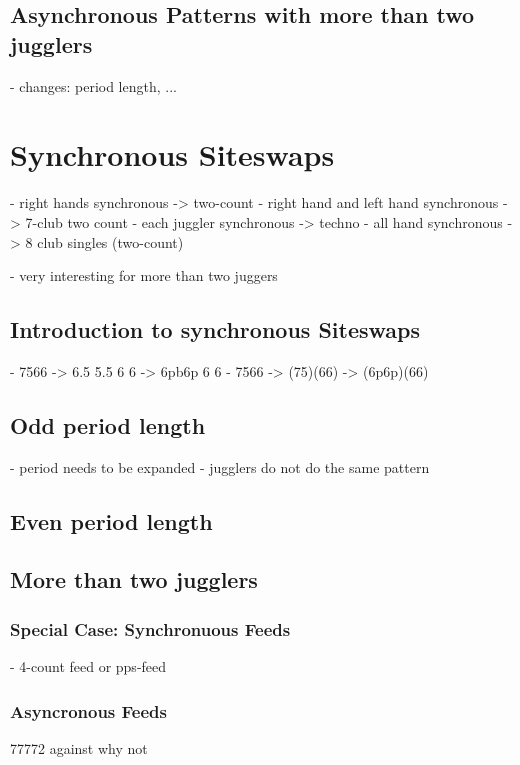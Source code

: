 \documentclass[a4paper,12pt,parskip=full]{scrreprt}
\begin{document}
	\section{Asynchronous Patterns with more than two jugglers}
	- changes: period length, ...
	\chapter{Synchronous Siteswaps}
	- right hands synchronous -> two-count
	- right hand and left hand synchronous -> 7-club two count
	- each juggler synchronous -> techno
	- all hand synchronous -> 8 club singles (two-count)
	
	- very interesting for more than two juggers
	
	\section{Introduction to synchronous Siteswaps}
	- 7566  ->  6.5  5.5  6  6  -> 6pb6p 6 6
	- 7566  -> (75)(66) -> (6p6p)(66)
	\section{Odd period length}
	- period needs to be expanded
	- jugglers do not do the same pattern
	
	\section{Even period length}
	\section{More than two jugglers}
	\subsection{Special Case: Synchronuous Feeds}
	- 4-count feed or pps-feed
	\subsection{Asyncronous Feeds}
	77772 against why not
\end{document}
